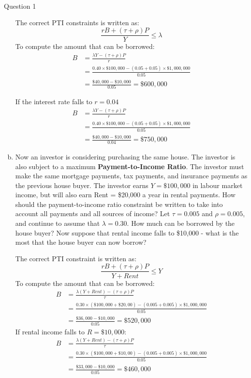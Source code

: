 \documentclass[a4paper]{article}
\begin{document}
\begin{questionbox}{Question 1}
\begin{enumerate}[(a)]
			\begin{explanationbox}
				The correct PTI constraints is written as:
				\[
					\frac{rB+(\tau+\rho)P}{Y} \leq \lambda
				\]
				To compute the amount that can be borrowed:
				\begin{align*}
					B &= \frac{\lambda Y - (\tau+\rho)P}{r}\\
					&= \frac{0.40\times\$100,000-(0.05+0.05)\times\$1,000,000}{0.05}\\
					&=\frac{\$40,000-\$10,000}{0.05} = \$600,000
				\end{align*}
		
				If the interest rate falls to \( r=0.04 \)
				\begin{align*}
					B &= \frac{\lambda Y - (\tau+\rho)P}{r}\\
					&= \frac{0.40\times\$100,000-(0.05+0.05)\times\$1,000,000}{0.05}\\
					&=\frac{\$40,000-\$10,000}{0.04} = \$750,000
				\end{align*}
			\end{explanationbox}
			\item Now an investor is considering purchasing the same house. The investor is also subject to a maximum \textbf{Payment-to-Income Ratio}. The investor must make the same mortgage payments, tax payments, and insurance payments as the previous house buyer. The investor earns \( Y = \$100,000 \) in labour market income, but will also earn Rent = \$20,000 a year in rental payments. How should the payment-to-income ratio constraint be written to take into account all payments and all sources of income? Let \( \tau = 0.005 \) and \( \rho = 0.005 \), and continue to assume that \( \lambda = 0.30 \). How much can be borrowed by the house buyer? Now suppose that rental income falls to \$10,000 - what is the most that the house buyer can now borrow?
			\begin{explanationbox}
				The correct PTI constraint is written as:
				\[
					\frac{rB+(\tau+\rho)P}{Y + Rent} \leq Y
				\]
				To compute the amount that can be borrowed:
				\begin{align*}
					B &= \frac{\lambda(Y+Rent)-(\tau+\rho)P}{\tau} \\
					&= \frac{0.30\times(\$100,000+\$20,00)-(0.005+0.005)\times\$1,000,000}{0.05} \\
					&= \frac{\$36,000-\$10,000}{0.05} = \$520,000
				\end{align*}
				If rental income falls to \( R=\$10,000 \):
				\begin{align*}
					B &= \frac{\lambda(Y+Rent)-(\tau+\rho)P}{\tau} \\
					&= \frac{0.30\times(\$100,000+\$10,00)-(0.005+0.005)\times\$1,000,000}{0.05} \\
					&= \frac{\$33,000-\$10,000}{0.05} = \$460,000
				\end{align*}
			\end{explanationbox}
		\end{enumerate}
	\end{questionbox}
\end{document}

